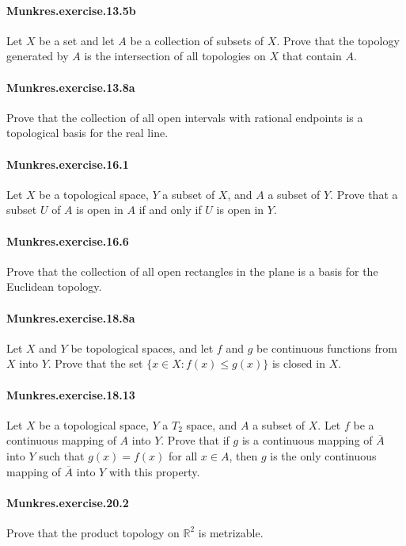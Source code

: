 \documentclass{article}
\begin{document}
\paragraph{Munkres.exercise.13.5b} Let $X$ be a set and let $A$ be a collection of subsets of $X$. Prove that the topology generated by $A$ is the intersection of all topologies on $X$ that contain $A$.

\paragraph{Munkres.exercise.13.8a} Prove that the collection of all open intervals with rational endpoints is a topological basis for the real line.

\paragraph{Munkres.exercise.16.1} Let $X$ be a topological space, $Y$ a subset of $X$, and $A$ a subset of $Y$. Prove that a subset $U$ of $A$ is open in $A$ if and only if $U$ is open in $Y$.

\paragraph{Munkres.exercise.16.6} Prove that the collection of all open rectangles in the plane is a basis for the Euclidean topology.

\paragraph{Munkres.exercise.18.8a} Let $X$ and $Y$ be topological spaces, and let $f$ and $g$ be continuous functions from $X$ into $Y$. Prove that the set $\{x\in X: f(x)\leq g(x)\}$ is closed in $X$.

\paragraph{Munkres.exercise.18.13} Let $X$ be a topological space, $Y$ a $T_2$ space, and $A$ a subset of $X$. Let $f$ be a continuous mapping of $A$ into $Y$. Prove that if $g$ is a continuous mapping of $\overline{A}$ into $Y$ such that $g(x)=f(x)$ for all $x \in A$, then $g$ is the only continuous mapping of $\overline{A}$ into $Y$ with this property.

\paragraph{Munkres.exercise.20.2} Prove that the product topology on $\mathbb{R}^2$ is metrizable.
\end{document}
